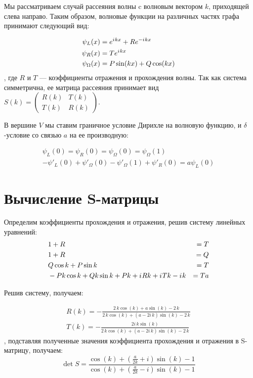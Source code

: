 \documentclass{nsart_eng}
\newcommand{\eexp}[1]{e^{#1}}
\newcommand{\iu}{{i\mkern1mu}}
\begin{document}
Мы рассматриваем случай рассеяния волны c волновым вектором $k$, приходящей слева направо. Таким образом, волновые функции на различных частях графа принимают следующий вид:

\begin{align*}
\psi_L(x) &= \eexp{\iu k x} + R \eexp{-\iu k x} \\
\psi_R(x) &= T \eexp{\iu k x}\\
\psi_\Omega(x) &= P \sin(k x) + Q \cos(k x)
\end{align*}
, где $R$ и $T$ — коэффициенты отражения и прохождения волны. Так как система симметрична, ее матрица рассеяния принимает вид
$S(k) = \begin{pmatrix} R(k) & T(k) \\ T(k) & R(k) \end{pmatrix}$.

В вершине $V$ мы ставим граничное условие Дирихле на волновую функцию, и $\delta$-условие со связью $a$ на ее производную:

\begin{align*}
\psi_L(0) = \psi_R(0) = \psi_\Omega(0) = \psi_\Omega(1) \\ 
-\psi'_L(0) + \psi'_\Omega(0) - \psi'_\Omega(1) + \psi'_R(0) = a \psi_L(0)
\end{align*}


\section{Вычисление S-матрицы}
Определим коэффициенты прохождения и отражения, решив систему линейных уравнений:
\begin{align*}
& 1 + R &= T \\
& 1 + R &= Q \\
& Q \cos k + P \sin k &= T \\
& -P k \cos k + Q k \sin k + P k + \iu R k + \iu T k - \iu k &= T a
\end{align*}

Решив систему, получаем:

\begin{align*}
R(k) = -\frac{2 \, k \cos\left(k\right) + a \sin\left(k\right) - 2 \, k}{2 \, k \cos\left(k\right) + {\left(a - 2 i \, k\right)} \sin\left(k\right) - 2 \, k} \\
T(k) = -\frac{2 i \, k \sin\left(k\right)}{2 \, k \cos\left(k\right) + {\left(a - 2 i \, k\right)} \sin\left(k\right) - 2 \, k}
\end{align*}
, подставляя полученные значения коэффициента прохождения и отражения в S-матрицу, получаем:
\[
\det S = 
\frac
{\cos\left(k\right) + {\left(\frac{a}{2 k} + i\right)} \sin\left(k\right) - 1}
{\cos\left(k\right) + {\left(\frac{a}{2 k} - i\right)} \sin\left(k\right) - 1}
\]
\end{document}
